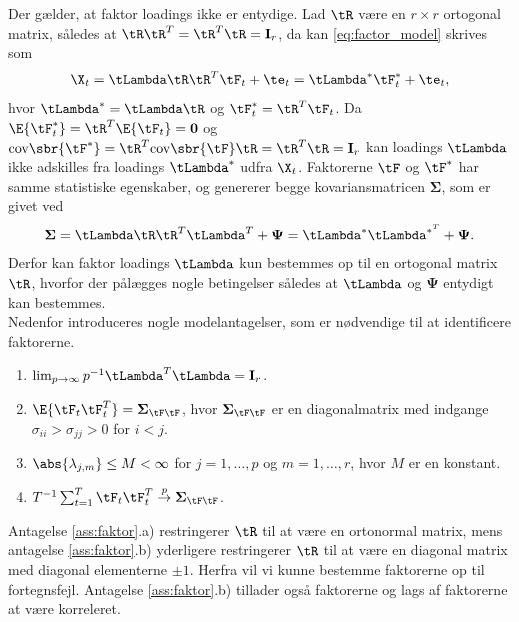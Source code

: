 %
Der gælder, at faktor loadings ikke er entydige. 
Lad \(\tR\) være en \(r \times r\) ortogonal matrix, således at \(\tR \tR^T = \tR^T \tR = \mathbf{I}_r\), da kan \eqref{eq:factor_model} skrives som
\begin{align*}
\X_t = \tLambda \tR \tR^T \tF_t + \te_t = \tLambda^* \tF_t^* + \te_t,
\end{align*}
hvor \(\tLambda^*=\tLambda \tR\) og \(\tF_t^*=\tR^T \tF_t\). 
Da \(\E{\tF_t^*} = \tR^T \E{\tF_t} = \mathbf{0}\) og \(\text{cov} \sbr{\tF^*} = \tR^T \text{cov} \sbr{\tF} \tR = \tR^T \tR = \mathbf{I}_r\) kan loadings \(\tLambda\) ikke adskilles fra loadings \(\tLambda^*\) udfra \(\X_t\).
Faktorerne \(\tF\) og \(\tF^*\) har samme statistiske egenskaber, og genererer begge kovariansmatricen \(\boldsymbol{\Sigma}\), som er givet ved
\begin{align*}
\boldsymbol{\Sigma} = \tLambda \tR \tR^T \tLambda^T + \boldsymbol{\Psi} = \tLambda^* \tLambda^{*^T} + \boldsymbol{\Psi}.
\end{align*}
Derfor kan faktor loadings \(\tLambda\) kun bestemmes op til en ortogonal matrix \(\tR\), hvorfor der pålægges nogle betingelser således at \(\tLambda\) og \(\boldsymbol{\Psi}\) entydigt kan bestemmes. \\[2mm]
%
Nedenfor introduceres nogle modelantagelser, som er nødvendige til at identificere faktorerne.
%
\begin{ass} \label{ass:faktor}
\begin{enumerate}[label=\alph*)]
\item \(\lim_{p \rightarrow \infty} p^{-1} \tLambda^T \tLambda = \mathbf{I}_r\). 
\item \(\E{\tF_t \tF_t^T} = \boldsymbol{\Sigma}_{\tF\tF}\), hvor \(\boldsymbol{\Sigma}_{\tF\tF}\) er en diagonalmatrix med indgange \(\sigma_{ii} > \sigma_{jj} > 0\) for \(i < j\).
\item \(\abs{\lambda_{j,m}} \leq M < \infty\) for \(j = 1, \ldots, p\) og \(m = 1, \ldots, r\), hvor \(M\) er en konstant.
\item \(T^{-1} \sum_{t=1}^T \tF_t \tF_t^T \overset{p}{\rightarrow} \boldsymbol{\Sigma}_{\tF\tF}\).
\end{enumerate}
\end{ass}
%
Antagelse \ref{ass:faktor}.a) restringerer \(\tR\) til at være en ortonormal matrix, mens antagelse \ref{ass:faktor}.b) yderligere restringerer \(\tR\) til at være en diagonal matrix med diagonal elementerne \(\pm 1\).
Herfra vil vi kunne bestemme faktorerne op til fortegnsfejl.
Antagelse \ref{ass:faktor}.b) tillader også faktorerne og lags af faktorerne at være korreleret.

